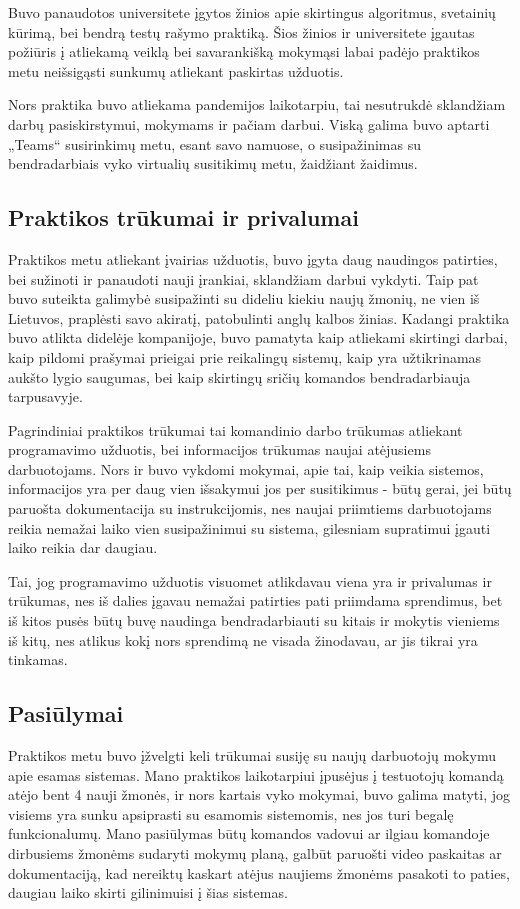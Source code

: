 \documentclass{VUMIFPSkursinis}
\begin{document}
Buvo panaudotos universitete įgytos žinios apie skirtingus algoritmus, svetainių kūrimą, bei bendrą testų rašymo praktiką. Šios žinios ir universitete įgautas požiūris į atliekamą veiklą bei savarankišką mokymąsi labai padėjo praktikos metu neišsigąsti sunkumų atliekant paskirtas užduotis. 

Nors praktika buvo atliekama pandemijos laikotarpiu, tai nesutrukdė sklandžiam darbų pasiskirstymui, mokymams ir pačiam darbui. Viską galima buvo aptarti „Teams“ susirinkimų metu, esant savo namuose, o susipažinimas su bendradarbiais vyko virtualių susitikimų metu, žaidžiant žaidimus.

\subsection{Praktikos trūkumai ir privalumai}

Praktikos metu atliekant įvairias užduotis, buvo įgyta daug naudingos patirties, bei sužinoti ir panaudoti nauji įrankiai, sklandžiam darbui vykdyti. Taip pat buvo suteikta galimybė susipažinti su dideliu kiekiu naujų žmonių, ne vien iš Lietuvos, praplėsti savo akiratį, patobulinti anglų kalbos žinias. Kadangi praktika buvo atlikta didelėje kompanijoje, buvo pamatyta kaip atliekami skirtingi darbai, kaip pildomi prašymai prieigai prie reikalingų sistemų, kaip yra užtikrinamas aukšto lygio saugumas, bei kaip skirtingų sričių komandos bendradarbiauja tarpusavyje.

Pagrindiniai praktikos trūkumai tai komandinio darbo trūkumas atliekant programavimo užduotis, bei informacijos trūkumas naujai atėjusiems darbuotojams. Nors ir buvo vykdomi mokymai, apie tai, kaip veikia sistemos, informacijos yra per daug vien išsakymui jos per susitikimus - būtų gerai, jei būtų paruošta dokumentacija su instrukcijomis, nes naujai priimtiems darbuotojams reikia nemažai laiko vien susipažinimui su sistema, gilesniam supratimui įgauti laiko reikia dar daugiau. 

Tai, jog programavimo užduotis visuomet atlikdavau viena yra ir privalumas ir trūkumas, nes iš dalies įgavau nemažai patirties pati priimdama sprendimus, bet iš kitos pusės būtų buvę naudinga bendradarbiauti su kitais ir mokytis vieniems iš kitų, nes atlikus kokį nors sprendimą ne visada žinodavau, ar jis tikrai yra tinkamas.

\subsection{Pasiūlymai}
Praktikos metu buvo įžvelgti keli trūkumai susiję su naujų darbuotojų mokymu apie esamas sistemas. Mano praktikos laikotarpiui įpusėjus į testuotojų komandą atėjo bent 4 nauji žmonės, ir nors kartais vyko mokymai, buvo galima matyti, jog visiems yra sunku apsiprasti su esamomis sistemomis, nes jos turi begalę funkcionalumų. Mano pasiūlymas būtų komandos vadovui ar ilgiau komandoje dirbusiems žmonėms sudaryti mokymų planą, galbūt paruošti video paskaitas ar dokumentaciją, kad nereiktų kaskart atėjus naujiems žmonėms pasakoti to paties, daugiau laiko skirti gilinimuisi į šias sistemas. 
\end{document}
